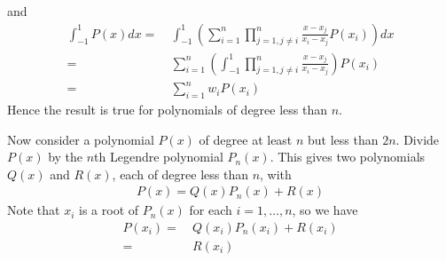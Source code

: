 \documentclass[a4paper]{article}
\numberwithin{equation}{section}
\begin{document}
and
\begin{align}
\int_{ - 1}^1 {P\left( x \right)dx}  =&\ \int_{ - 1}^1 {\left( {\sum\limits_{i = 1}^n {\prod\limits_{j = 1,j \ne i}^n {\frac{{x - {x_j}}}{{{x_i} - {x_j}}}} P\left( {{x_i}} \right)} } \right)dx} \\
=&\ \sum\limits_{i = 1}^n {\left( {\int_{ - 1}^1 {\prod\limits_{j = 1,j \ne i}^n {\frac{{x - {x_j}}}{{{x_i} - {x_j}}}} } } \right)P\left( {{x_i}} \right)} \\
 =&\ \sum\limits_{i = 1}^n {{w_i}P\left( {{x_i}} \right)} 
\end{align}
Hence the result is true for polynomials of degree less than $n$.

Now consider a polynomial $P\left(x\right)$ of degree at least $n$ but less than $2n$. Divide $P\left(x\right)$ by the $n$th Legendre polynomial $P_n\left(x\right)$. This gives two polynomials $Q\left(x\right)$ and $R\left(x\right)$, each of degree less than $n$, with
\begin{align}
P\left( x \right) = Q\left( x \right){P_n}\left( x \right) + R\left( x \right)
\end{align}
Note that $x_i$ is a root of $P_n\left(x\right)$ for each $i=1,\ldots,n$, so we have
\begin{align}
\label{3.78}
P\left( {{x_i}} \right) =&\ Q\left( {{x_i}} \right){P_n}\left( {{x_i}} \right) + R\left( {{x_i}} \right)\\
 =&\ R\left( {{x_i}} \right) \label{3.79}
\end{align}
\end{document}
